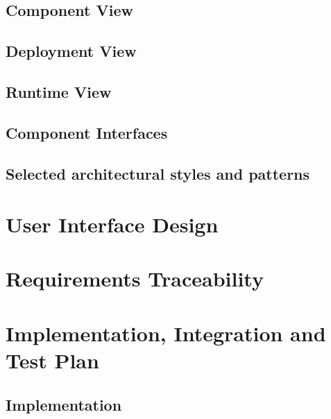 \documentclass[12pt, a4paper]{report}
\begin{document}
\section{Component View}


\section{Deployment View}


\section{Runtime View}


\section{Component Interfaces}


\section{Selected architectural styles and patterns}



\chapter{User Interface Design}
\label{ch:user_interface_design}




\chapter{Requirements Traceability}
\label{ch:requirement_traceability}



\chapter{Implementation, Integration and Test Plan}
\label{ch:implementaion_intergrationandtestplan}

\section{Implementation}

\end{document}

